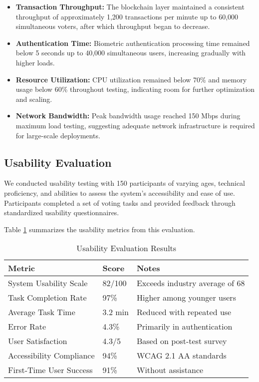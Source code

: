 \documentclass[conference]{IEEEtran}
\begin{document}
\begin{itemize}
    \item \textbf{Transaction Throughput:} The blockchain layer maintained a consistent throughput of approximately 1,200 transactions per minute up to 60,000 simultaneous voters, after which throughput began to decrease.
    
    \item \textbf{Authentication Time:} Biometric authentication processing time remained below 5 seconds up to 40,000 simultaneous users, increasing gradually with higher loads.
    
    \item \textbf{Resource Utilization:} CPU utilization remained below 70\% and memory usage below 60\% throughout testing, indicating room for further optimization and scaling.
    
    \item \textbf{Network Bandwidth:} Peak bandwidth usage reached 150 Mbps during maximum load testing, suggesting adequate network infrastructure is required for large-scale deployments.
\end{itemize}

\subsection{Usability Evaluation}
We conducted usability testing with 150 participants of varying ages, technical proficiency, and abilities to assess the system's accessibility and ease of use. Participants completed a set of voting tasks and provided feedback through standardized usability questionnaires.

Table \ref{tab:usability} summarizes the usability metrics from this evaluation.

\begin{table}[!h]
\caption{Usability Evaluation Results}
\label{tab:usability}
\centering
\begin{tabular}{|p{3cm}|p{1.5cm}|p{3.5cm}|}
\hline
\textbf{Metric} & \textbf{Score} & \textbf{Notes} \\
\hline
System Usability Scale & 82/100 & Exceeds industry average of 68 \\
\hline
Task Completion Rate & 97\% & Higher among younger users \\
\hline
Average Task Time & 3.2 min & Reduced with repeated use \\
\hline
Error Rate & 4.3\% & Primarily in authentication \\
\hline
User Satisfaction & 4.3/5 & Based on post-test survey \\
\hline
Accessibility Compliance & 94\% & WCAG 2.1 AA standards \\
\hline
First-Time User Success & 91\% & Without assistance \\
\hline
\end{tabular}
\end{table}
\end{document}
